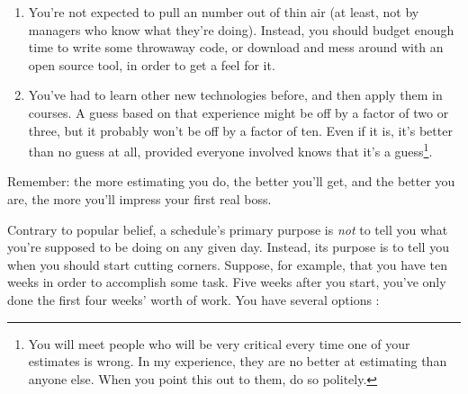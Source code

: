 \documentclass{report}
\begin{document}
\begin{enumerate}

  \item You're not expected to pull an number out of thin air (at
  least, not by managers who know what they're doing).  Instead, you
  should budget enough time to write some throwaway code, or download
  and mess around with an open source tool, in order to get a feel for
  it.

  \item You've had to learn other new technologies before, and then
  apply them in courses.  A guess based on that experience might be
  off by a factor of two or three, but it probably won't be off by a
  factor of ten.  Even if it is, it's better than no guess at all,
  provided everyone involved knows that it's a guess\footnote{You will
  meet people who will be very critical every time one of your
  estimates is wrong.  In my experience, they are no better at
  estimating than anyone else.  When you point this out to them, do so
  politely.}.

\end{enumerate}

Remember: the more estimating you do, the better you'll get, and the
better you are, the more you'll impress your first real boss.


Contrary to popular belief, a schedule's primary purpose is \emph{not}
to tell you what you're supposed to be doing on any given day.
Instead, its purpose is to tell you when you should start cutting
corners.  Suppose, for example, that you have ten weeks in order to
accomplish some task.  Five weeks after you start, you've only done
the first four weeks' worth of work.  You have several options
\cite{b:rothman-manage-it}:
\end{document}
